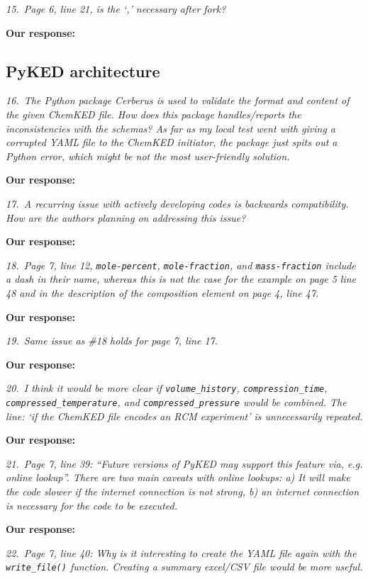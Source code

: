 \documentclass[a4paper,10pt]{elsarticle}
\begin{document}
\textit{15.~Page 6, line 21, is the `,' necessary after fork?}

\textbf{Our response:}


\subsection*{PyKED architecture}

\textit{16.~The Python package Cerberus is used to validate the format and content of the given ChemKED file. How does this package handles/reports the inconsistencies with the schemas? As far as my local test went with giving a corrupted YAML file to the ChemKED initiator, the package just spits out a Python error, which might be not the most user-friendly solution.}

\textbf{Our response:}


\textit{17.~A recurring issue with actively developing codes is backwards compatibility. How are the authors planning on addressing this issue?}

\textbf{Our response:}


\textit{18.~Page 7, line 12, \texttt{mole-percent}, \texttt{mole-fraction}, and \texttt{mass-fraction} include a dash in their name, whereas this is not the case for the example on page 5 line 48 and in the description of the composition element on page 4, line 47.}

\textbf{Our response:}


\textit{19.~Same issue as \#18 holds for page 7, line 17.}

\textbf{Our response:}


\textit{20.~I think it would be more clear if \texttt{volume\_history}, \texttt{compression\_time}, \texttt{compressed\_temperature},
and \texttt{compressed\_pressure} would be combined. The line: `if the ChemKED file encodes an
RCM experiment' is unnecessarily repeated.}

\textbf{Our response:}


\textit{21.~Page 7, line 39: ``Future versions of PyKED may support this feature via, e.g. online lookup''.
There are two main caveats with online lookups: a) It will make the code slower if the internet
connection is not strong, b) an internet connection is necessary for the code to be executed.}

\textbf{Our response:}


\textit{22.~Page 7, line 40: Why is it interesting to create the YAML file again with the \texttt{write\_file()} function.
Creating a summary excel/CSV file would be more useful.}
\end{document}
